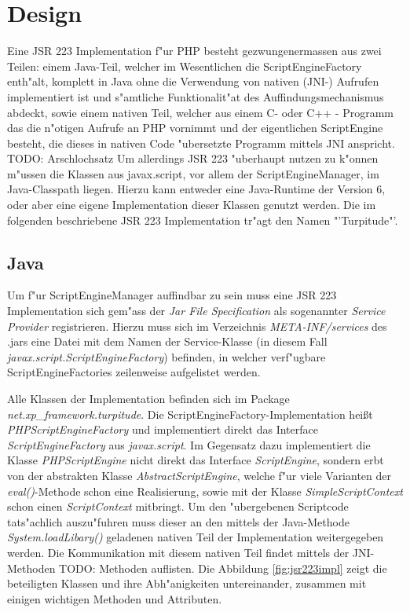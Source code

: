 \section{Design}
\label{sec:chap1:design}

Eine JSR 223 Implementation f"ur PHP besteht gezwungenermassen aus zwei Teilen: einem Java-Teil, welcher im Wesentlichen
die ScriptEngineFactory enth"alt, komplett in Java ohne die Verwendung von nativen (JNI-) Aufrufen implementiert ist und
s"amtliche Funktionalit"at des Auffindungsmechanismus abdeckt, sowie einem nativen Teil, welcher aus 
einem C- oder C++ - Programm das die n"otigen Aufrufe an PHP vornimmt und der eigentlichen ScriptEngine besteht, die dieses in
nativen Code "ubersetzte Programm mittels JNI anspricht. TODO: Arschlochsatz
Um allerdings JSR 223 "uberhaupt nutzen zu k"onnen m"ussen die Klassen aus javax.script, vor allem der ScriptEngineManager, 
im Java-Classpath liegen. Hierzu kann entweder eine Java-Runtime der Version 6, oder aber eine eigene Implementation dieser
Klassen genutzt werden.
Die im folgenden beschriebene JSR 223 Implementation tr"agt den Namen "'Turpitude"'.

\subsection{Java}
\label{sec:chap1:design:java}

Um f"ur ScriptEngineManager auffindbar zu sein muss eine JSR 223 Implementation sich gem"ass der \emph{Jar File Specification} \cite{JARSPEC} 
als sogenannter \emph{Service Provider} registrieren. Hierzu muss sich im Verzeichnis \emph{META-INF/services} des .jars eine Datei
mit dem Namen der Service-Klasse (in diesem Fall \emph{javax.script.ScriptEngineFactory}) befinden, in welcher verf"ugbare 
ScriptEngineFactories zeilenweise aufgelistet werden.

Alle Klassen der Implementation befinden sich im Package \emph{net.xp\_framework.turpitude}. 
Die ScriptEngineFactory-Implementation hei\ss t \emph{PHPScriptEngineFactory} und implementiert direkt das Interface 
\emph{ScriptEngineFactory} aus \emph{javax.script}. Im Gegensatz dazu implementiert die Klasse \emph{PHPScriptEngine} nicht
direkt das Interface \emph{ScriptEngine}, sondern erbt von der abstrakten Klasse \emph{AbstractScriptEngine}, welche f"ur
viele Varianten der \emph{eval()}-Methode schon eine Realisierung, sowie mit der Klasse \emph{SimpleScriptContext} schon einen 
\emph{ScriptContext} mitbringt. Um den "ubergebenen Scriptcode tats"achlich auszu"fuhren muss dieser an den mittels der Java-Methode
\emph{System.loadLibary()} geladenen nativen Teil der Implementation weitergegeben werden. Die Kommunikation mit diesem
nativen Teil findet mittels der JNI-Methoden TODO: Methoden auflisten.
Die Abbildung \ref{fig:jsr223impl} zeigt die beteiligten Klassen und ihre Abh"anigkeiten untereinander,
zusammen mit einigen wichtigen Methoden und Attributen. 

